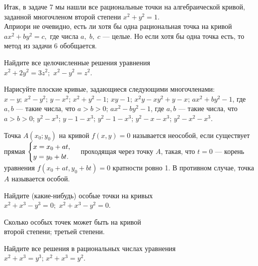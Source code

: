 \documentclass[a4paper,12pt]{article}
\begin{document}
Итак, в задаче 7 мы нашли все рациональные точки на алгебраической кривой, заданной многочленом второй степени $x^2 + y^2 = 1$.\\
Априори не очевидно, есть ли хотя бы одна рациональная точка на кривой $ax^2 + by^2 = c,$ где числа $a,\;b,\;c$ --- целые. Но если хотя бы одна точка есть, то метод из задачи 6 обобщается.


  Найдите все целочисленные решения уравнения\\
   $x^2 + 2y^2 = 3z^2;$  $x^2 - y^2 = z^2.$

  Нарисуйте плоские кривые, задающиеся следующими многочленами:\\
 $x-y$;
 $x^2-y^2$;
 $y-x^2$;
 $x^2+y^2-1$;
 $xy-1$;
 $x^2y-xy^2+y-x$;
 $ax^2+by^2-1$, где $a,b$ --- такие числа, что $a>b>0$;
 $ax^2-by^2-1$, где $a,b$ --- такие числа, что $a>b>0$;
 $y^2-x^3$;\quad
{} $y-1-x^3$;\quad
{} $y^2-1-x^3$;\quad
{} $y^2-x-x^3$;\quad
{} $y^2-x^2-x^3$.

Точка $A(x_0;y_0)$ на кривой $f(x,y)=0$ называется неособой, если существует прямая
$
\begin{cases}
x = x_0+at,\\
y = y_0+bt.
\end{cases}$
проходящая через точку $A$, такая, что $t = 0$ --- корень уравнения $f(x_0+at,y_0+bt)=0$ кратности ровно 1. В противном случае, точка $A$ называется особой.

  Найдите (какие-нибудь) особые точки на кривых\\
   $x^2 + x^3 - y^3 = 0;$  $x^2 + x^3 - y^2 = 0.$

  Сколько особых точек может быть на кривой\\
   второй степени;  третьей степени.

  Найдите все решения в рациональных числах уравнения\\
   $x^2 + x^3 = y^3$;  $x^2 + x^3 = y^2.$

\end{document}

